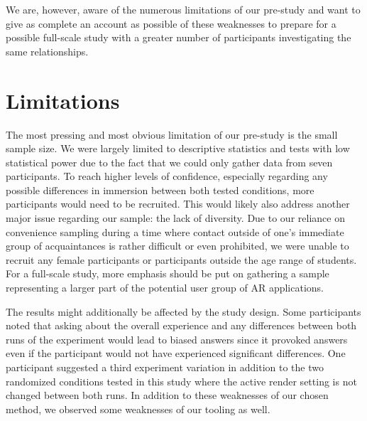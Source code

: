 \documentclass[12pt,twoside,english]{article}
\begin{document}
We are, however, aware of the numerous limitations of our pre-study and want to give as complete an account as possible of these weaknesses to prepare for a possible full-scale study with a greater number of participants investigating the same relationships.

\section{Limitations}
\label{sect:limitations}

The most pressing and most obvious limitation of our pre-study is the small sample size.
We were largely limited to descriptive statistics and tests with low statistical power due to the fact that we could only gather data from seven participants.
To reach higher levels of confidence, especially regarding any possible differences in immersion between both tested conditions, more participants would need to be recruited.
This would likely also address another major issue regarding our sample: the lack of diversity.
Due to our reliance on convenience sampling during a time where contact outside of one's immediate group of acquaintances is rather difficult or even prohibited, we were unable to recruit any female participants or participants outside the age range of students.
For a full-scale study, more emphasis should be put on gathering a sample representing a larger part of the potential user group of \gls{AR} applications.

The results might additionally be affected by the study design.
Some participants noted that asking about the overall experience and any differences between both runs of the experiment would lead to biased answers since it provoked answers even if the participant would not have experienced significant differences.
One participant suggested a third experiment variation in addition to the two randomized conditions tested in this study where the active render setting is not changed between both runs.
In addition to these weaknesses of our chosen method, we observed some weaknesses of our tooling as well.
\end{document}

